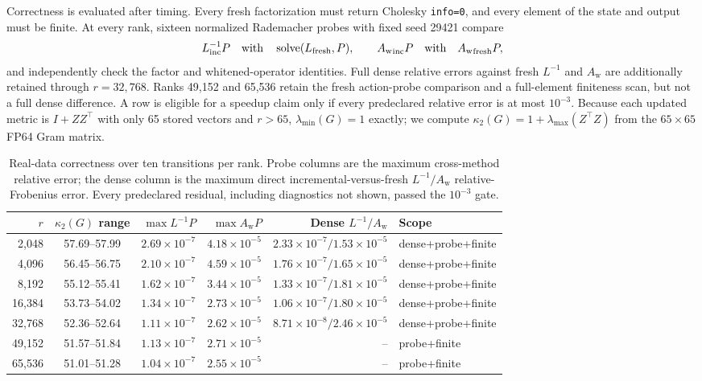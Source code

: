 \documentclass[11pt]{article}
\newcommand{\Aw}{A_{\mathrm w}}
\begin{document}
Correctness is evaluated after timing.  Every fresh factorization must return
Cholesky \texttt{info=0}, and every element of the state and output must be
finite.  At every rank, sixteen normalized Rademacher probes with fixed seed
29421 compare
\[
 L_{\rm inc}^{-1}P\quad\text{with}\quad
 \operatorname{solve}(L_{\rm fresh},P),\qquad
 {\Aw}_{\rm inc}P\quad\text{with}\quad{\Aw}_{\rm fresh}P,
\]
and independently check the factor and whitened-operator identities.  Full
dense relative errors against fresh \(L^{-1}\) and \(\Aw\) are additionally
retained through \(r=32{,}768\).
Ranks 49,152 and 65,536 retain the fresh action-probe comparison and a
full-element finiteness scan, but not a full dense difference.  A row is
eligible for a speedup claim only if every predeclared relative error is at
most \(10^{-3}\).  Because each updated metric is \(I+ZZ^\top\) with only 65
stored vectors and \(r>65\), \(\lambda_{\min}(G)=1\) exactly; we compute
\(\kappa_2(G)=1+\lambda_{\max}(Z^\top Z)\) from the \(65\times65\) FP64
Gram matrix.

\begin{table}[ht]
\centering
\scriptsize
\caption{Real-data correctness over ten transitions per rank.  Probe columns
are the maximum cross-method relative error; the dense column is the maximum
direct incremental-versus-fresh \(L^{-1}/\Aw\) relative-Frobenius error.
Every predeclared residual, including diagnostics not shown, passed the
\(10^{-3}\) gate.}
\label{tab:e5-blackhole-valid}
{\setlength{\tabcolsep}{2.2pt}
\begin{tabular}{@{}rcrrrl@{}}
\toprule
\(r\) & \(\kappa_2(G)\) range &
\(\max L^{-1}P\) & \(\max \Aw P\) &
Dense \(L^{-1}/\Aw\) & Scope \\
\midrule
2,048  & 57.69--57.99 & \(2.69\times10^{-7}\) & \(4.18\times10^{-5}\) &
  \(2.33\times10^{-7}/1.53\times10^{-5}\) & dense+probe+finite \\
4,096  & 56.45--56.75 & \(2.10\times10^{-7}\) & \(4.59\times10^{-5}\) &
  \(1.76\times10^{-7}/1.65\times10^{-5}\) & dense+probe+finite \\
8,192  & 55.12--55.41 & \(1.62\times10^{-7}\) & \(3.44\times10^{-5}\) &
  \(1.33\times10^{-7}/1.81\times10^{-5}\) & dense+probe+finite \\
16,384 & 53.73--54.02 & \(1.34\times10^{-7}\) & \(2.73\times10^{-5}\) &
  \(1.06\times10^{-7}/1.80\times10^{-5}\) & dense+probe+finite \\
32,768 & 52.36--52.64 & \(1.11\times10^{-7}\) & \(2.62\times10^{-5}\) &
  \(8.71\times10^{-8}/2.46\times10^{-5}\) & dense+probe+finite \\
49,152 & 51.57--51.84 & \(1.13\times10^{-7}\) & \(2.71\times10^{-5}\) &
  -- & probe+finite \\
65,536 & 51.01--51.28 & \(1.04\times10^{-7}\) & \(2.55\times10^{-5}\) &
  -- & probe+finite \\
\bottomrule
\end{tabular}
}
\end{table}
\end{document}
